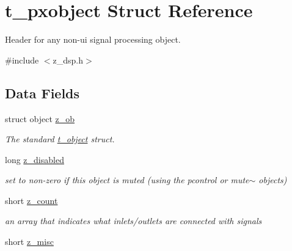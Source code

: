 \hypertarget{structt__pxobject}{
\section{t\_\-pxobject Struct Reference}
\label{structt__pxobject}
}


Header for any non-\/ui signal processing object.  


{\ttfamily \#include $<$z\_\-dsp.h$>$}\subsection*{Data Fields}
\begin{DoxyCompactItemize}
\item 
\hypertarget{structt__pxobject_a70794d26e031cec4b1c59cd4ff83a163}{
struct object \hyperlink{structt__pxobject_a70794d26e031cec4b1c59cd4ff83a163}{z\_\-ob}}
\label{structt__pxobject_a70794d26e031cec4b1c59cd4ff83a163}

\begin{DoxyCompactList}\small\item\em The standard \hyperlink{structt__object}{t\_\-object} struct. \item\end{DoxyCompactList}\item 
\hypertarget{structt__pxobject_a70b75cdf768ff989e0d5527c15107b69}{
long \hyperlink{structt__pxobject_a70b75cdf768ff989e0d5527c15107b69}{z\_\-disabled}}
\label{structt__pxobject_a70b75cdf768ff989e0d5527c15107b69}

\begin{DoxyCompactList}\small\item\em set to non-\/zero if this object is muted (using the pcontrol or mute$\sim$ objects) \item\end{DoxyCompactList}\item 
\hypertarget{structt__pxobject_a958d0a9f778886711fa0d23469664b5f}{
short \hyperlink{structt__pxobject_a958d0a9f778886711fa0d23469664b5f}{z\_\-count}}
\label{structt__pxobject_a958d0a9f778886711fa0d23469664b5f}

\begin{DoxyCompactList}\small\item\em an array that indicates what inlets/outlets are connected with signals \item\end{DoxyCompactList}\item 
\hypertarget{structt__pxobject_ace9ac8873bbc20c703036e4f28835ca7}{
short \hyperlink{structt__pxobject_ace9ac8873bbc20c703036e4f28835ca7}{z\_\-misc}}
\label{structt__pxobject_ace9ac8873bbc20c703036e4f28835ca7}


\end{DoxyCompactItemize}
